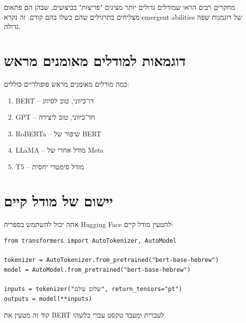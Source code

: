 מחקרים רבים הראו שמודלים גדולים יותר מציגים "פריצות" בביצועים,
שבהן הם פתאום מצליחים בתרגילים שהם כשלו בהם קודם.
זה נקרא \textenglish{emergent abilities} של דוגמנות שפה גדולה.

\section{דוגמאות למודלים מאומנים מראש}

כמה מודלים מאומנים מראש פופולריים כוללים:

\begin{enumerate}
\item \textenglish{BERT} – דו־כיווני, טוב לסיווג
\item \textenglish{GPT} – חד־כיווני, טוב ליצירה
\item \textenglish{RoBERTa} – שיפור של \textenglish{BERT}
\item \textenglish{LLaMA} – מודל אחרי של \textenglish{Meta}
\item \textenglish{T5} – מודל סימטרי יחסית
\end{enumerate}

\section{יישום של מודל קיים}

אתה יכול להשתמש בספריה \textenglish{Hugging Face} להטעין מודל קיים:

\begin{LTR}
\begin{verbatim}
from transformers import AutoTokenizer, AutoModel

tokenizer = AutoTokenizer.from_pretrained("bert-base-hebrew")
model = AutoModel.from_pretrained("bert-base-hebrew")

inputs = tokenizer("שלום עולם", return_tensors="pt")
outputs = model(**inputs)
\end{verbatim}
\end{LTR}

קוד זה מטעין את \textenglish{BERT} לעברית ומעבד טקסט עברי כלשהו.
